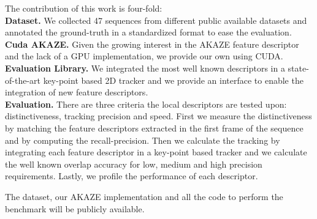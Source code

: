 \documentclass[letterpaper, 10pt, conference]{ieeeconf}
\begin{document}
The contribution of this work is four-fold:\\
\textbf{Dataset.} We collected 47 sequences from different public available datasets and annotated the ground-truth in a standardized format to ease the evaluation.\\
\textbf{Cuda AKAZE.} Given the growing interest in the AKAZE feature descriptor and the lack of a GPU implementation, we provide our own using CUDA.\\
\textbf{Evaluation Library.} We integrated the most well known descriptors in a state-of-the-art key-point based 2D tracker and we provide an interface to enable the integration of new feature descriptors.\\
\textbf{Evaluation.}  There are three criteria the local descriptors are tested upon: distinctiveness, tracking precision and speed. First we measure the distinctiveness by matching the feature descriptors extracted in the first frame of the sequence and by computing the recall-precision. Then we calculate the tracking by integrating each feature descriptor in a key-point based tracker and we calculate the well known overlap accuracy for low, medium and high precision requirements. Lastly, we profile the performance of each descriptor.

The dataset, our AKAZE implementation and all the code to perform the benchmark will be publicly available.





%










%
\end{document}
